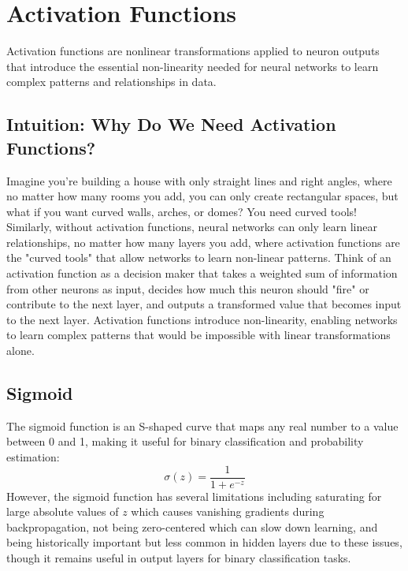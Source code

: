 
\section{Activation Functions }
\label{sec:activation-functions}

Activation functions are nonlinear transformations applied to neuron outputs that introduce the essential non-linearity needed for neural networks to learn complex patterns and relationships in data.

\subsection{Intuition: Why Do We Need Activation Functions?}

Imagine you're building a house with only straight lines and right angles, where no matter how many rooms you add, you can only create rectangular spaces, but what if you want curved walls, arches, or domes? You need curved tools! Similarly, without activation functions, neural networks can only learn linear relationships, no matter how many layers you add, where activation functions are the "curved tools" that allow networks to learn non-linear patterns. Think of an activation function as a decision maker that takes a weighted sum of information from other neurons as input, decides how much this neuron should "fire" or contribute to the next layer, and outputs a transformed value that becomes input to the next layer. Activation functions introduce non-linearity, enabling networks to learn complex patterns that would be impossible with linear transformations alone.

\subsection{Sigmoid}

The sigmoid function is an S-shaped curve that maps any real number to a value between 0 and 1, making it useful for binary classification and probability estimation:
\begin{equation}
\sigma(z) = \frac{1}{1 + e^{-z}}
\end{equation} However, the sigmoid function has several limitations including saturating for large absolute values of $z$ which causes vanishing gradients during backpropagation, not being zero-centered which can slow down learning, and being historically important but less common in hidden layers due to these issues, though it remains useful in output layers for binary classification tasks.

